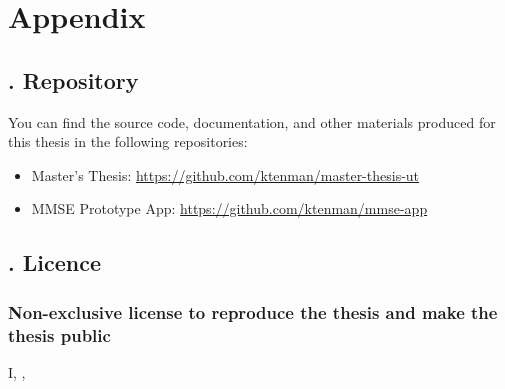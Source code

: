\appendix

\section*{Appendix}

\renewcommand{\theappendixcounter}{\Roman{appendixcounter}}



\subsection*{. Repository} \label{appendix:repository}


You can find the source code, documentation, and other materials produced for this thesis in the following repositories:
\begin{itemize}
    \item Master's Thesis: \url{https://github.com/ktenman/master-thesis-ut}
    \item MMSE Prototype App: \url{https://github.com/ktenman/mmse-app}
\end{itemize}



\subsection*{. Licence}


\subsubsection*{Non-exclusive license to reproduce the thesis and make the thesis public}

I, \textbf{\authorname}, %


